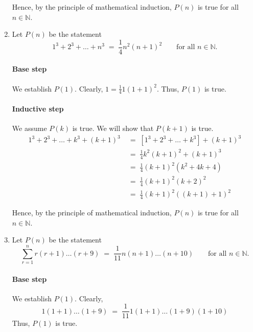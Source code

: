 \documentclass[10pt]{article}
\begin{document}
\begin{enumerate}
                Hence, by the principle of mathematical induction, $P(n)$ is true for all $n \in \mathbb{N}$.

                \item Let $P(n)$ be the statement
                \[1^3 + 2^3 + \dots + n^3 \;=\; \frac{1}{4}n^2(n + 1)^2 \quad\quad\text{for all }n \in \mathbb{N}.\]
                \paragraph{Base step}
                We establish $P(1)$. Clearly, $1 = \frac{1}{4}1(1 + 1)^2$. Thus, $P(1)$ is true.
                \paragraph{Inductive step}
                We assume $P(k)$ is true. We will show that $P(k + 1)$ is true.
                \begin{align*}
                        1^3 + 2^3 + \dots + k^3 + (k + 1)^3
                                \;&=\; [1^3 + 2^3 + \dots + k^3] + (k + 1)^3 \\
                                \;&=\; \frac{1}{4}k^2(k + 1)^2 + (k + 1)^3 \tag{From $P(k)$}\\
                                \;&=\; \frac{1}{4}(k + 1)^2(k^2 + 4k + 4)\\
                                \;&=\; \frac{1}{4}(k + 1)^2(k + 2)^2\\
                                \;&=\; \frac{1}{4}(k + 1)^2((k + 1) + 1)^2
                \end{align*}

                Hence, by the principle of mathematical induction, $P(n)$ is true for all $n \in \mathbb{N}$.
                
                \item Let $P(n)$ be the statement
                \[\sum_{r = 1}^n r(r + 1)\dots(r + 9) \;=\; \frac{1}{11}n(n + 1)\dots(n + 10) \quad\quad\text{for all }n \in \mathbb{N}.\]
                \paragraph{Base step}
                We establish $P(1)$. Clearly, 
                \[1(1 + 1)\dots(1 + 9) \;=\; \frac{1}{11}1(1 + 1)\dots(1 + 9)(1 + 10)\]
                Thus, $P(1)$ is true.

\end{enumerate}
\end{document}
